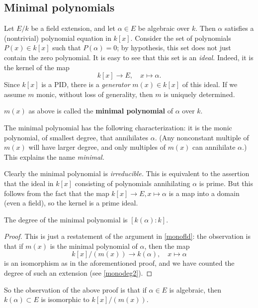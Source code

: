 \subsection{Minimal polynomials}

Let $E/k$ be a field extension, and let $\alpha \in E$ be algebraic over $k$.
Then $\alpha$ satisfies a (nontrivial) polynomial equation in $k[x]$.
Consider the set of polynomials $P(x) \in k[x]$ such that $P(\alpha) = 0$; by
hypothesis, this set does not just contain the zero polynomial.
It is easy to see that this set is an \emph{ideal.} Indeed, it is the kernel
of the map
\[ k[x] \to E, \quad x \mapsto \alpha.  \]
Since $k[x]$ is a PID, 
there is a \emph{generator} $m(x) \in k[x]$ of this ideal. If we assume $m$
monic, without loss of generality, then $m$ is uniquely determined.

\begin{definition} 
$m(x)$ as above is called the \textbf{minimal polynomial} of $\alpha$ over $k$.
\end{definition} 

The minimal polynomial has the following characterization: it is the monic
polynomial, of smallest degree, that annihilates $\alpha$. (Any nonconstant
multiple of $m(x)$ will have larger degree, and only multiples of $m(x)$ can
annihilate $\alpha$.)
This explains the name \emph{minimal.}

Clearly the minimal polynomial is \emph{irreducible.} This is equivalent to the
assertion that the ideal in $k[x]$ consisting of polynomials annihilating
$\alpha$ is prime. But this follows from the fact that the map $k[x] \to E, x
\mapsto \alpha$ is
a map into a domain (even a field), so the kernel is a prime ideal.

\begin{proposition} 
The degree of the minimal polynomial is $[k(\alpha):k]$.
\end{proposition} 
\begin{proof} 
This is just a restatement of the argument in \cref{monofld}: the observation is that if $m(x)$
is the minimal polynomial of $\alpha$, then the map
\[ k[x]/(m(x)) \to k(\alpha), \quad x \mapsto \alpha  \]
is an isomorphism as in the aforementioned proof, and we have counted the degree
of such an extension  (see \cref{monodeg2}).
\end{proof} 

So the observation of the above proof is that if $\alpha \in E$ is algebraic,
then $k(\alpha) \subset E$ is isomorphic to $k[x]/(m(x))$.


